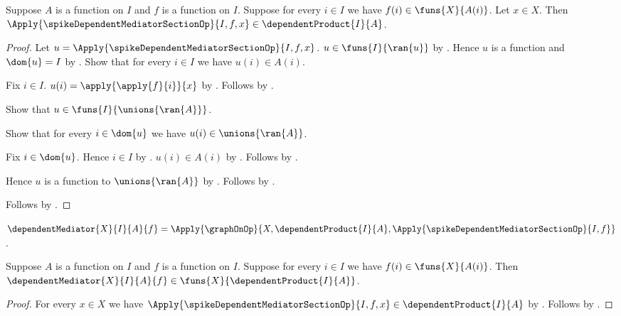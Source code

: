 \begin{proposition}\label{spike_dependent_mediator_section_type}
    Suppose $A$ is a function on $I$ and $f$ is a function on $I$.
    Suppose for every $i\in I$ we have $f(i)\in\funs{X}{A(i)}$.
    Let $x\in X$.
    Then
        $\Apply{\spikeDependentMediatorSectionOp}{I,f,x}
            \in\dependentProduct{I}{A}$.
\end{proposition}
\begin{proof}
    Let $u=\Apply{\spikeDependentMediatorSectionOp}{I,f,x}$.
    $u\in\funs{I}{\ran{u}}$ by
        .
    Hence $u$ is a function and $\dom{u}=I$ by
        .
    Show that for every $i\in I$ we have $u(i)\in A(i)$.
    \begin{subproof}
        Fix $i\in I$.
        $u(i)=\apply{\apply{f}{i}}{x}$ by
            .
        Follows by .
    \end{subproof}
    Show that $u\in\funs{I}{\unions{\ran{A}}}$.
    \begin{subproof}
        Show that for every $i\in\dom{u}$ we have
            $u(i)\in\unions{\ran{A}}$.
        \begin{subproof}
            Fix $i\in\dom{u}$.
            Hence $i\in I$ by \auto.
            $u(i)\in A(i)$ by \auto.
            Follows by .
        \end{subproof}
        Hence $u$ is a function to $\unions{\ran{A}}$ by \auto.
        Follows by .
    \end{subproof}
    Follows by .
\end{proof}

\begin{definition}\label{spike_dependent_mediator}
    $\dependentMediator{X}{I}{A}{f}
        =\Apply{\graphOnOp}{
            X,\dependentProduct{I}{A},
            \Apply{\spikeDependentMediatorSectionOp}{I,f}}$.
\end{definition}

\begin{proposition}\label{spike_dependent_mediator_type}
    Suppose $A$ is a function on $I$ and $f$ is a function on $I$.
    Suppose for every $i\in I$ we have $f(i)\in\funs{X}{A(i)}$.
    Then
        $\dependentMediator{X}{I}{A}{f}\in
            \funs{X}{\dependentProduct{I}{A}}$.
\end{proposition}
\begin{proof}
    For every $x\in X$ we have
        $\Apply{\spikeDependentMediatorSectionOp}{I,f,x}
            \in\dependentProduct{I}{A}$ by
        .
    Follows by
        .
\end{proof}

